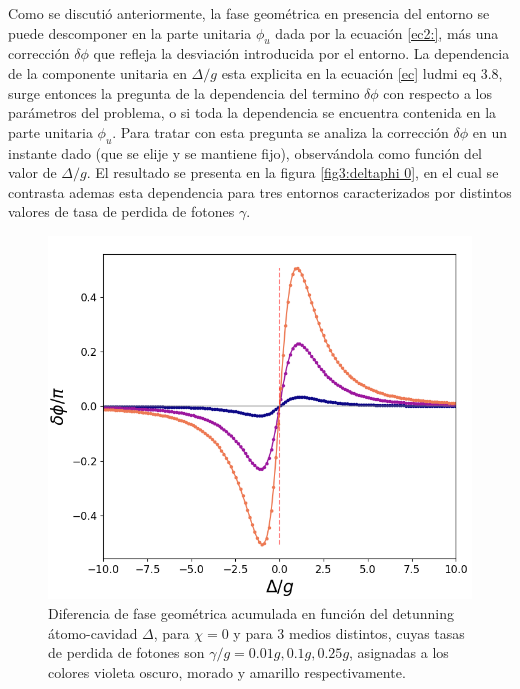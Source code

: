 Como se discutió anteriormente, la fase geométrica en presencia del entorno se puede descomponer en la parte unitaria $\phi_u$ dada por la ecuación \ref{ec2:}, más una corrección $\delta\phi$ que refleja la desviación introducida por el entorno. La dependencia de la componente unitaria en $\Delta/g$ esta explicita en la ecuación \ref{ec} ludmi eq 3.8, surge entonces la pregunta de la dependencia del termino $\delta\phi$ con respecto a los parámetros del problema, o si toda la dependencia se encuentra contenida en la parte unitaria $\phi_u$. Para tratar con esta pregunta se analiza la corrección $\delta\phi$ en un instante dado (que se elije y se mantiene fijo), observándola como función del valor de $\Delta/g$. El resultado se presenta en la figura \ref{fig3:deltaphi 0}, en el cual se contrasta ademas esta dependencia para tres entornos caracterizados por distintos valores de tasa de perdida de fotones $\gamma$.
\begin{figure}[H]
    \begin{minipage}[c]{0.67\textwidth}
        \includegraphics[width=\textwidth]{figuras/ch3/robustez.png}
    \end{minipage}\hfill
    \begin{minipage}[c]{0.3\textwidth}
    \caption{Diferencia de fase geométrica acumulada en función del detunning átomo-cavidad $\Delta$, para $\chi=0$ y para 3 medios distintos, cuyas tasas de perdida de fotones son $\gamma/g=0.01g,0.1g,0.25g$, asignadas a los colores violeta oscuro, morado y amarillo respectivamente.
         } \label{fig3:robustez 0}
  \end{minipage}
\end{figure}
